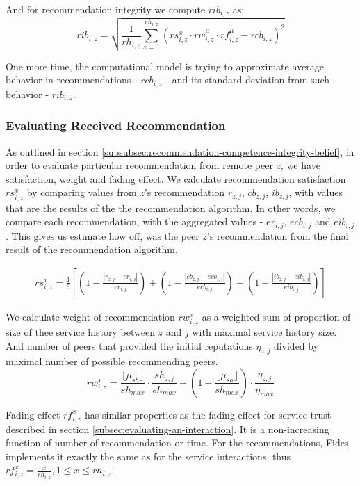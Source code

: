 \noindent
And for recommendation integrity we compute $rib_{i, z}$ as:
\begin{equation}
    rib_{i, z} = \sqrt{\frac{1}{rh_{i, z}} \sum_{x=1}^{rh_{i,z}} \left(rs_{i,z}^{x} \cdot rw_{i, z}^{\mu} \cdot rf_{i,z}^{\mu} - rcb_{i,z}\right)^{2}}
\end{equation}

\noindent
One more time, the computational model is trying to approximate average behavior in recommendations - $rcb_{i,z}$ - and its standard deviation from such behavior - $rib_{i,z}$.

\subsubsection{Evaluating Received Recommendation}
As outlined in section \ref{subsubsec:recommendation-competence-integrity-belief}, in order to evaluate particular recommendation from remote peer $z$, we have satisfaction, weight and fading effect. 
We calculate recommendation satisfaction $rs^{x}_{i,z}$ by comparing values from $z$'s recommendation $r_{z,j}$, $cb_{z,j}$, $ib_{z,j}$, with values that are the results of the the recommendation algorithm.
In other words, we compare each recommendation, with the aggregated values - $er_{i,j}$, $ecb_{i,j}$ and $eib_{i,j}$. This gives us estimate how off, was the peer $z$'s recommendation from the final result of the recommendation algorithm.

\begin{equation}
\begin{split}
    rs^{x}_{i,z} = \frac{1}{3} \left[ \left(1-\frac{\left|r_{z, j} - er_{i,j}\right|}{er_{i,j}}\right) + \left(1 - \frac{\left|cb_{z, j} - ecb_{i, j}\right|}{ecb_{i, j}}\right) + \left(1 - \frac{\left|ib_{z, j} - eib_{i, j}\right|}{eib_{i, j}}\right) \right]
\end{split}
\end{equation}

We calculate weight of recommendation $rw^{x}_{i,z}$ as a weighted sum of proportion of size of thee service history between $z$ and $j$ with maximal service history size. And number of peers that provided the initial reputations $\eta_{z,j}$ divided by maximal number of possible recommending peers.
\begin{equation}
    rw^{x}_{i,z} = \frac{\lfloor\mu_{sh}\rfloor}{sh_{max}} \cdot \frac{sh_{z, j}}{sh_{max}} + \left(1 - \frac{\lfloor\mu_{sh}\rfloor}{sh_{max}}\right) \cdot \frac{\eta_{z,j}}{\eta_{max}}
\end{equation}

Fading effect $rf^{x}_{i, z}$ has similar properties as the fading effect for service trust described in section \ref{subsec:evaluating-an-interaction}. It is a non-increasing function of number of recommendation or time. 
For the recommendations, Fides implements it exactly the same as for the service interactions, thus $rf^{x}_{i, z} = \frac{x}{rh_{i, z}}, 1 \leq x \leq rh_{i,z}$.
